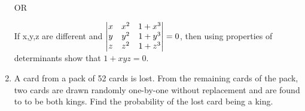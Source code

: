 \documentclass[journal,12pt,twocolumn]{IEEEtran}
\renewcommand\thesection{\arabic{section}}
\begin{document}
\begin{enumerate}[label=\thesection.\arabic*.,ref=\thesection.\theenumi]
    \begin{center}
        OR
    \end{center}
    \vspace{0.3in}
If x,y,z are different and $\begin{vmatrix}x & x^2 & 1+x^3 \\ y & y^2 & 1+y^3 \\ z & z^2 & 1+z^3\end{vmatrix} =0 $, then using properties of determinants show that $1+xyz=0.$\\

\item A card from a pack of 52 cards is lost. From the remaining cards of the pack, two cards are drawn randomly one-by-one without replacement and are found to to be both kings. Find the probability of the lost card being a king.\\
\end{enumerate}
\end{document}
